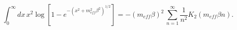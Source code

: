 \begin{equation}
\int _{0}^{\infty }dx\, x^{2}\log \left[1-e^{-\left(x^{2}+m_{eff}^{2}\beta ^{2}\right)^{1/2}}\right]=-\left(m_{eff}\beta \right)^{2}\, \sum _{n=1}^{\infty }\frac{1}{n^{2}}K_{2}\left(m_{eff}\beta n\right).\end{equation}

